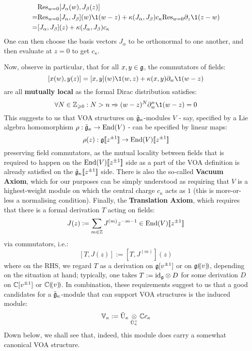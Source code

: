                 $$
                    \begin{aligned}
                        & \Res_{w = 0} [J_{\alpha}(w), J_{\beta}(z)]
                        \\
                        = & \Res_{w = 0} [J_{\alpha}, J_{\beta}](w) \1(w - z) + \kappa(J_{\alpha}, J_{\beta}) c_{\kappa} \Res_{w = 0} \del_z \1(z - w)
                        \\
                        = & [J_{\alpha}, J_{\beta}](z) + \kappa(J_{\alpha}, J_{\beta}) c_{\kappa} 
                    \end{aligned}
                $$
            One can then choose the basis vectors $J_{\alpha}$ to be orthonormal to one another, and then evaluate at $z = 0$ to get $c_{\kappa}$. 

            Now, observe in particular, that for all $x, y \in \mathfrak{g}$, the commutators of fields:
                $$[x(w), y(z)] = [x, y](w) \1(w, z) + \kappa(x, y) \del_w \1(w - z)$$
            are all \textbf{mutually local} as the formal Dirac distribution satisfies:
                $$\forall N \in \Z_{\geq 0}: N > n \implies (w - z)^N \del_w^n \1(w - z) = 0$$
            This suggests to us that VOA structures on $\tilde{\mathfrak{g}}_{\kappa}$-modules $V$ - say, specified by a Lie algebra homomorphism $\rho: \tilde{\mathfrak{g}}_{\kappa} \to \mathrm{End}(V)$ - can be specified by linear maps:
                $$\rho(z): \mathfrak{g}[\![z^{\pm 1}]\!] \to \mathrm{End}(V)[\![z^{\pm 1}]\!]$$
            preserving field commutators, as the mutual locality between fields that is required to happen on the $\mathrm{End}(V)[\![z^{\pm 1}]\!]$ side as a part of the VOA definition is already satisfied on the $\tilde{\mathfrak{g}}_{\kappa}[\![z^{\pm 1}]\!]$ side. There is also the so-called \textbf{Vacuum Axiom}, which for our purposes can be simply understood as requiring that $V$ is a highest-weight module on which the central charge $c_{\kappa}$ acts as $1$ (this is more-or-less a normalising condition). Finally, the \textbf{Translation Axiom}, which requires that there is a formal derivation $T$ acting on fields:
                $$J(z) := \sum_{m \in \mathbb{Z}} J^{(m)} z^{-m - 1} \in \mathrm{End}(V)[\![z^{\pm 1}]\!]$$
            via commutators, i.e.:
                $$[T, J(z)] := [T, J^{(m)}](z)$$
            where on the RHS, we regard $T$ as a derivation on $\mathfrak{g}[v^{\pm 1}]$ or on $\mathfrak{g}(\!(v)\!)$, depending on the situation at hand; typically, one takes $T := \id_{\g} \tensor D$ for some derivation $D$ on $\mathbb{C}[v^{\pm 1}]$ or $\mathbb{C}(\!(v)\!)$. In combination, these requirements suggest to us that a good candidates for a $\tilde{\mathfrak{g}}_{\kappa}$-module that can support VOA structures is the induced module:
                $$\V_{\kappa} := \tilde{\rmU}_{\kappa} \tensor_{\tilde{\rmU}_{\kappa}^+} \bbC c_{\kappa}$$
            Down below, we shall see that, indeed, this module does carry a somewhat canonical VOA structure.

